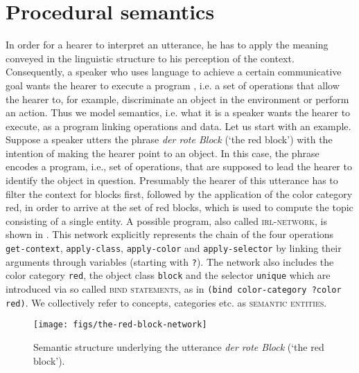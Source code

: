 \section{Procedural semantics}
\label{s:grounded-procedural-semantics}
In order for a hearer to interpret an utterance, he has to apply the 
meaning conveyed in the linguistic structure to his perception of 
the context. Consequently, a speaker who 
uses language to achieve a certain communicative goal wants 
the hearer to execute a program \citep{johnson1977procedural}, 
i.e. a set of operations that allow the hearer to, for example, discriminate 
an object in the environment or perform an action. Thus we model semantics, 
i.e. what it is a speaker wants the hearer to execute, as a 
program linking operations and data.  Let us start with an example. 
Suppose a speaker utters the phrase \textit{der rote Block} (`the red block') with the intention 
of making the hearer point to an object. In this case, the phrase 
encodes a program, i.e., set of operations, that are supposed to lead 
the hearer to identify the object in question. Presumably
the hearer of this utterance has to filter the context for blocks first, 
followed by the application of the color category
red, in order to arrive at the set of red blocks, which is used to 
compute the topic consisting of a single entity. A possible program, 
also called \textsc{irl-network}, is shown in .
This network explicitly represents the chain of the four operations {\footnotesize\tt get-context},
{\footnotesize\tt apply-class}, {\footnotesize\tt apply-color} and {\footnotesize\tt apply-selector}
by linking their arguments through variables 
(starting with {\footnotesize\tt ?}). The network also 
includes the color category {\footnotesize\tt red}, 
the object class {\footnotesize\tt block} and the selector 
{\footnotesize\tt unique} which are introduced via so called 
\textsc{bind statements}, as in 
{\footnotesize\tt (bind color-category ?color red)}. We collectively
refer to concepts, categories etc. as \textsc{semantic entities}.

\begin{figure}
	\center
	\texttt{[image: figs/the-red-block-network]}
	\caption{Semantic structure underlying the utterance \textit{der rote Block} (`the red block').}
	\label{f:the-red-block-network}
\end{figure}

